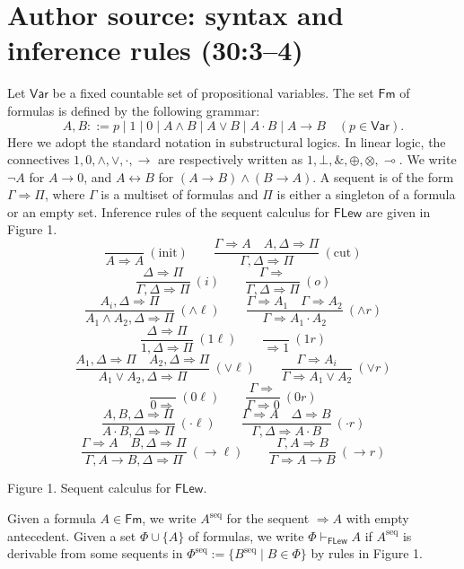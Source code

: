 \documentclass[10pt,a4paper]{article}
\newcommand{\FLew}{\mathsf{FLew}}
\begin{document}
\section*{Author source: syntax and inference rules (30:3--4)}
Let $\mathsf{Var}$ be a fixed countable set of propositional variables. The set $\mathsf{Fm}$ of formulas is defined by the following grammar:
\[
 A,B::=p\mid1\mid0\mid A\wedge B\mid A\vee B\mid A\cdot B\mid A\to B\quad(p\in\mathsf{Var}).
\]
Here we adopt the standard notation in substructural logics. In linear logic, the connectives $1,0,\wedge,\vee,\cdot,\to$ are respectively written as $1,\bot,\&,\oplus,\otimes,\multimap$. We write $\neg A$ for $A\to0$, and $A\leftrightarrow B$ for $(A\to B)\wedge(B\to A)$.
A sequent is of the form $\Gamma\Rightarrow\Pi$, where $\Gamma$ is a multiset of formulas and $\Pi$ is either a singleton of a formula or an empty set. Inference rules of the sequent calculus for $\FLew$ are given in Figure 1.
\[
 \frac{}{A\Rightarrow A}\ (\mathrm{init})\qquad
 \frac{\Gamma\Rightarrow A\quad A,\Delta\Rightarrow\Pi}{\Gamma,\Delta\Rightarrow\Pi}\ (\mathrm{cut})
\]
\[
 \frac{\Delta\Rightarrow\Pi}{\Gamma,\Delta\Rightarrow\Pi}\ (i)\qquad
 \frac{\Gamma\Rightarrow}{\Gamma,\Delta\Rightarrow\Pi}\ (o)
\]
\[
 \frac{A_i,\Delta\Rightarrow\Pi}{A_1\wedge A_2,\Delta\Rightarrow\Pi}\ (\wedge\ell)\qquad
 \frac{\Gamma\Rightarrow A_1\quad\Gamma\Rightarrow A_2}{\Gamma\Rightarrow A_1\cdot A_2}\ (\wedge r)
\]
\[
 \frac{\Delta\Rightarrow\Pi}{1,\Delta\Rightarrow\Pi}\ (1\ell)\qquad \frac{}{\Rightarrow1}\ (1r)
\]
\[
 \frac{A_1,\Delta\Rightarrow\Pi\quad A_2,\Delta\Rightarrow\Pi}{A_1\vee A_2,\Delta\Rightarrow\Pi}\ (\vee\ell)\qquad
 \frac{\Gamma\Rightarrow A_i}{\Gamma\Rightarrow A_1\vee A_2}\ (\vee r)
\]
\[
 \frac{}{0\Rightarrow}\ (0\ell)\qquad \frac{\Gamma\Rightarrow}{\Gamma\Rightarrow0}\ (0r)
\]
\[
 \frac{A,B,\Delta\Rightarrow\Pi}{A\cdot B,\Delta\Rightarrow\Pi}\ (\cdot\ell)\qquad
 \frac{\Gamma\Rightarrow A\quad\Delta\Rightarrow B}{\Gamma,\Delta\Rightarrow A\cdot B}\ (\cdot r)
\]
\[
 \frac{\Gamma\Rightarrow A\quad B,\Delta\Rightarrow\Pi}{\Gamma,A\to B,\Delta\Rightarrow\Pi}\ (\to\ell)\qquad
 \frac{\Gamma,A\Rightarrow B}{\Gamma\Rightarrow A\to B}\ (\to r)
\]
\begin{center}Figure 1. Sequent calculus for $\FLew$.\end{center}
Given a formula $A\in\mathsf{Fm}$, we write $A^{\mathrm{seq}}$ for the sequent $\Rightarrow A$ with empty antecedent.
Given a set $\Phi\cup\{A\}$ of formulas, we write $\Phi\vdash_{\FLew} A$ if $A^{\mathrm{seq}}$ is derivable from some sequents in $\Phi^{\mathrm{seq}}:=\{B^{\mathrm{seq}}\mid B\in\Phi\}$ by rules in Figure 1.
\end{document}
